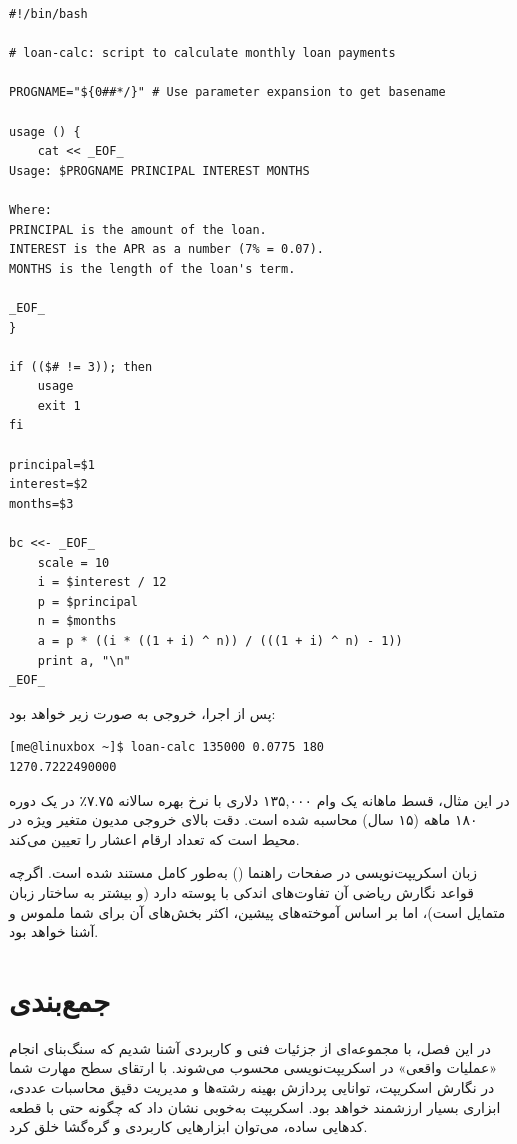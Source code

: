 \begin{latin}
\begin{lstlisting}
#!/bin/bash

# loan-calc: script to calculate monthly loan payments

PROGNAME="${0##*/}" # Use parameter expansion to get basename

usage () {
    cat << _EOF_
Usage: $PROGNAME PRINCIPAL INTEREST MONTHS

Where:
PRINCIPAL is the amount of the loan.
INTEREST is the APR as a number (7% = 0.07).
MONTHS is the length of the loan's term.

_EOF_
}

if (($# != 3)); then
    usage
    exit 1
fi

principal=$1
interest=$2
months=$3

bc <<- _EOF_
    scale = 10
    i = $interest / 12
    p = $principal
    n = $months
    a = p * ((i * ((1 + i) ^ n)) / (((1 + i) ^ n) - 1))
    print a, "\n"
_EOF_
\end{lstlisting}
\end{latin}

پس از اجرا، خروجی به صورت زیر خواهد بود:

\begin{latin}
\begin{lstlisting}
[me@linuxbox ~]$ loan-calc 135000 0.0775 180
1270.7222490000
\end{lstlisting}
\end{latin}

در این مثال، قسط ماهانه یک وام ۱۳۵,۰۰۰ دلاری با نرخ بهره سالانه ۷.۷۵٪ در یک دوره ۱۸۰ ماهه (۱۵ سال) محاسبه شده است. دقت بالای خروجی مدیون متغیر ویژه  در محیط  است که تعداد ارقام اعشار را تعیین می‌کند.

زبان اسکریپت‌نویسی  در صفحات راهنما () به‌طور کامل مستند شده است. اگرچه قواعد نگارش ریاضی آن تفاوت‌های اندکی با پوسته  دارد (و بیشتر به ساختار زبان  متمایل است)، اما بر اساس آموخته‌های پیشین، اکثر بخش‌های آن برای شما ملموس و آشنا خواهد بود.

\section{جمع‌بندی}

در این فصل، با مجموعه‌ای از جزئیات فنی و کاربردی آشنا شدیم که سنگ‌بنای انجام «عملیات واقعی» در اسکریپت‌نویسی محسوب می‌شوند. با ارتقای سطح مهارت شما در نگارش اسکریپت، توانایی پردازش بهینه رشته‌ها و مدیریت دقیق محاسبات عددی، ابزاری بسیار ارزشمند خواهد بود. اسکریپت  به‌خوبی نشان داد که چگونه حتی با قطعه کدهایی ساده، می‌توان ابزارهایی کاربردی و گره‌گشا خلق کرد.

